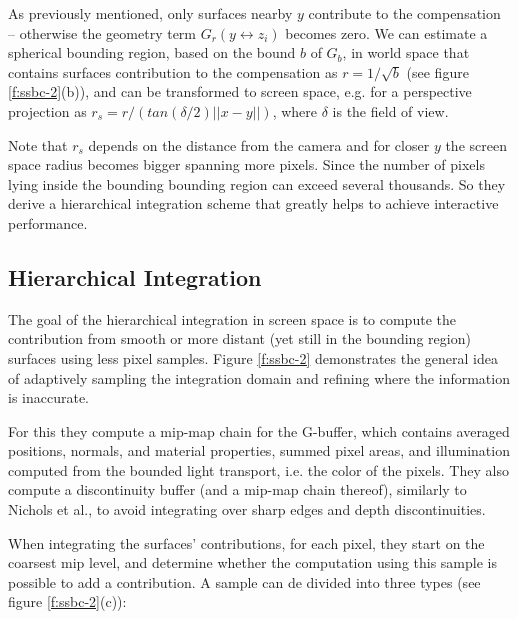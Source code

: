 As previously mentioned, only surfaces nearby $y$ contribute to the compensation -- otherwise the geometry term $G_r(y\leftrightarrow z_i)$ becomes zero. We can estimate a spherical bounding region, based on the bound $b$ of $G_b$, in world space that contains surfaces contribution to the compensation as $r=1/\sqrt{b}$ (see figure \ref{f:ssbc-2}(b)), and can be transformed to screen space, e.g. for a perspective projection as $r_s=r/(tan(\delta /2)||x-y||)$, where $\delta$ is the field of view.

Note that $r_s$ depends on the distance from the camera and for closer $y$ the screen space radius becomes bigger spanning more pixels. Since the number of pixels lying inside the bounding bounding region can exceed several thousands. So they derive a hierarchical integration scheme that greatly helps to achieve interactive performance.



\subsection{Hierarchical Integration}
The goal of the hierarchical integration in screen space is to compute the contribution from smooth or more distant (yet still in the bounding region) surfaces using less pixel samples. Figure \ref{f:ssbc-2} demonstrates the general idea of adaptively sampling the integration domain and refining where the information is inaccurate.

For this they compute a mip-map chain for the G-buffer, which contains averaged positions, normals, and material properties, summed pixel areas, and illumination computed from the bounded light transport, i.e. the color of the pixels. They also compute a discontinuity buffer (and a mip-map chain thereof), similarly to Nichols et al.\cite{a:Hierarchicalimage-spaceradiosityforinteractiveglobalillumination}, to avoid integrating over sharp edges and depth discontinuities.

When integrating the surfaces' contributions, for each pixel, they start on the coarsest mip level, and determine whether the computation using this sample is possible to add a contribution. A sample can de divided into three types (see figure \ref{f:ssbc-2}(c)):



